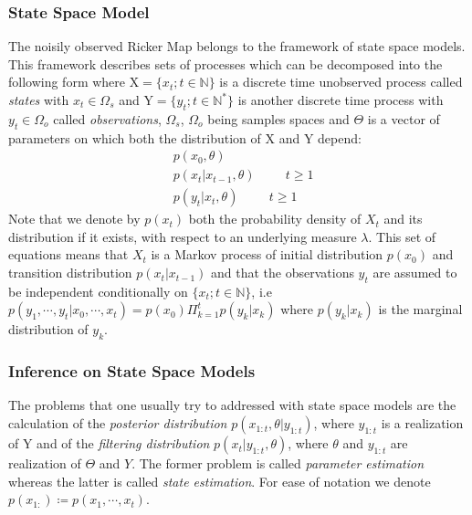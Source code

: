 \documentclass{article}
\begin{document}
	\subsubsection{State Space Model}
	The noisily observed Ricker Map belongs to the framework of state space models. This framework describes sets of processes which can be decomposed into the following form where $\mathrm{X}=\{x_t ; t \in \mathbb{N}\}$ is a discrete time unobserved process called \emph{states} with $x_t \in \Omega_s$ and $\mathrm{Y}=\{y_t ; t \in \mathbb{N^*}\}$ is another discrete time process with $y_t \in \Omega_o$ called \emph{observations}, $\Omega_s$, $\Omega_o$ being samples spaces and $\Theta$ is a vector of parameters on which both the distribution of $\mathrm{X}$ and $\mathrm{Y}$ depend:
	\begin{align}
		& p(x_0, \theta) \\
		& p(x_t | x_{t-1}, \theta) \hspace{1cm} t \ge 1\\
		& p(y_t | x_t, \theta) \hspace{1cm} t \ge 1
	\end{align}
	Note that we denote by $p(x_t)$ both the probability density of $X_t$ and its distribution if it exists, with respect to an underlying measure $\lambda$. This set of equations means that $X_t$ is a Markov process of initial distribution $p(x_0)$ and transition distribution $p(x_t | x_{t-1})$ and that the observations $y_t$ are assumed to be independent conditionally on $\{x_t ; t \in \mathbb{N}\}$, i.e $p(y_1, \cdots, y_t | x_0, \cdots, x_t) =p(x_0)\Pi_{k=1}^t p(y_k | x_k)$ where $p(y_k | x_k)$ is the marginal distribution of $y_k$. \\
	
	\subsubsection{Inference on State Space Models}
	The problems that one usually try to addressed with state space models are the calculation of the \emph{posterior distribution} $p(x_{1:t}, \theta|y_{1:t})$, where $y_{1:t}$ is a realization of $\mathrm{Y}$ and of the \emph{filtering distribution} $p(x_t|y_{1:t}, \theta)$, where $\theta$ and $y_{1:t}$ are realization of $\Theta$ and $Y$. The former problem is called \emph{parameter estimation} whereas the latter is called \emph{state estimation}. For ease of notation we denote $p(x_{1:}) \coloneqq p(x_1, \cdots, x_t)$. \\
	
\end{document}
